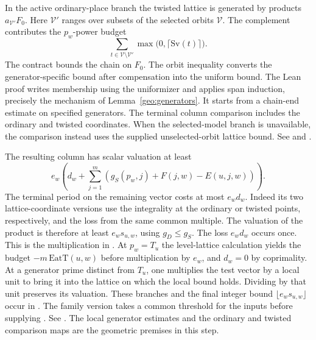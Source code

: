 In the active ordinary-place branch the twisted lattice is generated by products \(a_{\mathcal V'}F_0\). Here \(\mathcal V'\) ranges over subsets of the selected orbits \(\mathcal V\). The complement contributes the \(p_w\)-power budget
\[
 \sum_{t\in\mathcal V\setminus\mathcal V'}
       \max\bigl(0,\lceil \mathrm{Sv}(t)\rceil\bigr).
\]
The contract  bounds the chain on \(F_0\). The orbit inequality  converts the generator-specific bound after compensation into the uniform bound. The Lean proof writes membership using the uniformizer and applies span induction, precisely the mechanism of Lemma~\ref{geo:generators}. It starts from a chain-end estimate on specified generators. The terminal column comparison includes the ordinary and twisted coordinates. When the selected-model branch is unavailable, the comparison instead uses the supplied unselected-orbit lattice bound. See  and .

The resulting column has scalar valuation at least
\[
 e_w\left(d_w+\sum_{j=1}^m(g_S(p_w,j)+F(j,w)-E(u,j,w))\right).
\]
The terminal period on the remaining vector costs at most \(e_w d_w\). Indeed its two lattice-coordinate versions use the integrality at the ordinary or twisted points, respectively, and the loss from the same common multiple. The valuation of the product is therefore at least \(e_w s_{u,w}\), using \(g_D\le g_S\). The loss \(e_w d_w\) occurs once. This is the multiplication in . At \(p_w=T_u\) the level-lattice calculation yields the budget \(-m\,\mathrm{EatT}(u,w)\) before multiplication by \(e_w\), and \(d_w=0\) by coprimality. At a generator prime distinct from \(T_u\), one multiplies the test vector by a local unit to bring it into the lattice on which the local bound holds. Dividing by that unit preserves its valuation. These branches and the final integer bound \(\lfloor e_ws_{u,w}\rfloor\) occur in . The family version takes a common threshold for the inputs before supplying . See . The local generator estimates and the ordinary and twisted comparison maps are the geometric premises in this step.

